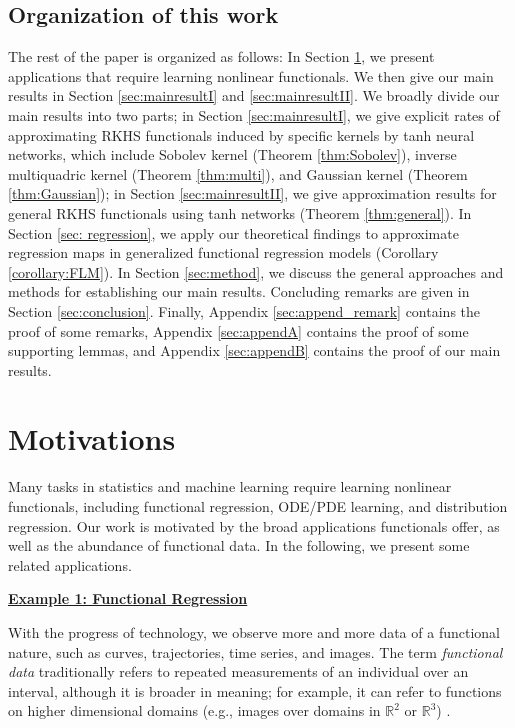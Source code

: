 \documentclass{article}
\def\RR{\mathbb R}
\numberwithin{equation}{section}
\begin{document}
 \subsection{Organization of this work}
 The rest of the paper is organized as follows: 
In Section \ref{sec:motivation}, we present applications that require learning nonlinear functionals. We then give our main results in Section \ref{sec:mainresultI} and \ref{sec:mainresultII}. We broadly divide our main results into two parts;  in Section \ref{sec:mainresultI}, we give explicit rates of approximating RKHS functionals induced by specific kernels by tanh neural networks, which include Sobolev kernel (Theorem \ref{thm:Sobolev}), inverse multiquadric kernel (Theorem \ref{thm:multi}), and Gaussian kernel (Theorem \ref{thm:Gaussian}); in Section \ref{sec:mainresultII}, we give approximation results for general RKHS functionals using tanh networks (Theorem \ref{thm:general}). 
In Section \ref{sec: regression}, we apply our theoretical findings to approximate regression maps in generalized functional regression models (Corollary \ref{corollary:FLM}). 
In Section \ref{sec:method}, we discuss the general approaches and methods for establishing our main results.
 Concluding remarks are given in Section \ref{sec:conclusion}. 
 Finally, Appendix \ref{sec:append_remark} contains the proof of some remarks, Appendix \ref{sec:appendA} contains the proof of some supporting lemmas, and Appendix \ref{sec:appendB} contains the proof of our main results.  
 
\section{Motivations}
\label{sec:motivation}
Many tasks in statistics and machine learning require learning nonlinear functionals, including functional regression, ODE/PDE learning,  and distribution regression. 
Our work is motivated by the broad applications functionals offer, as well as the abundance of functional data. 
In the following, we present some related applications.   

\vspace{2pt}
\noindent \underline{\bf Example 1: Functional Regression}
\vspace{2pt}

With the progress of technology, we observe more and more data of a functional nature, such as curves, trajectories, time series, and images. 
The term \textit{functional data} traditionally refers to  repeated measurements of an individual over an interval, although it
is broader in meaning; for example, it can refer to functions on higher dimensional
domains (e.g., images over domains in $\RR^2$ or $\RR^3$) \citep{greven2017general}. 
\end{document}
